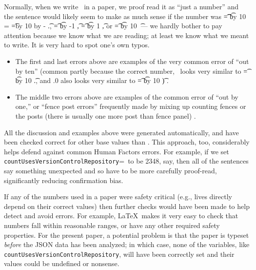 \documentclass{article}
\begin{document}
Normally, when we write \the\countUsesVersionControlRepository\ in a paper, we proof read it as ``just a number'' and the sentence would likely seem to make as much sense if the number was 
\newcount\t
\t=\countUsesVersionControlRepository
\divide \t by 10
\newcount\fraction
\fraction=\countUsesVersionControlRepository
\newcount\tent \tent=\t \multiply \tent by 10
\advance\fraction by -\tent
\the\t.\the\fraction,
\t=\countUsesVersionControlRepository
\advance \t by -1
\the\t,
\t=\countUsesVersionControlRepository
\advance \t by 1
\the\t, or
\t=\countUsesVersionControlRepository
\multiply \t by 10
\the\t\ --- we hardly bother to pay attention because we know what we are reading; at least we know what we meant to write. It is very hard to spot one's own typos. 

\begin{itemize}\raggedright
\item
The first and last errors above are examples of the very common error of ``out by ten'' (common partly because the correct number, \the\countUsesVersionControlRepository\ looks very similar to \t=\countUsesVersionControlRepository
\divide \t by 10
\the\t.\the\fraction, and \the\countUsesVersionControlRepository.0 also looks very similar to 
\t=\countUsesVersionControlRepository
\multiply \t by 10
\the\t) \cite{fixit}. 

\item
The middle two errors above are examples of the common error of ``out by one,'' or ``fence post errors'' frequently made by mixing up counting fences or the posts (there is usually one more post than fence panel) \cite{fixit}.
\end{itemize}

All the discussion and examples above were generated automatically, and have been checked  correct for other base values than \the\countUsesVersionControlRepository. This approach, too, considerably helps defend against common Human Factors errors. For example, if we set \texttt{\bslash countUsesVersionControlRepository}=\the\countUsesVersionControlRepository\ to be 2348, say, then all of the sentences say something unexpected and so have to be more carefully proof-read, significantly reducing confirmation bias.

If any of the numbers used in a paper were safety critical (e.g., lives directly depend on their correct values) then further checks would have been made to help detect and avoid errors. For example, \LaTeX\ makes it very easy to check that numbers fall within reasonable ranges, or have any other required safety properties. For the present paper, a potential problem is that the paper is typeset \emph{before\/} the JSON data has been analyzed; in which case, none of the variables, like \texttt{\bslash countUsesVersionControlRepository}, will have been correctly set and their values could be undefined or nonsense.
\end{document}
